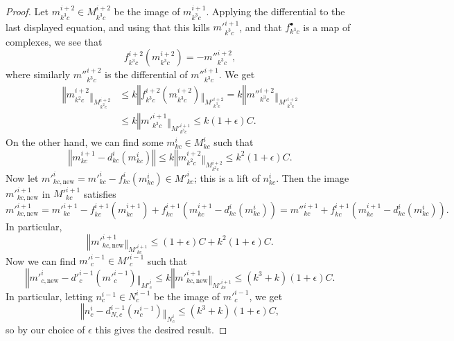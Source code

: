 \begin{proof}
Let $m^{i+2}_{k^3c}\in M^{i+2}_{k^3c}$ be the image of $m^{i+1}_{k^3c}$. Applying the differential to the last displayed equation, and using that this kills $m'^{i+1}_{k^3c}$, and that $f^\bullet_{k^3c}$ is a map of complexes, we see that
\[
f^{i+2}_{k^3c}(m^{i+2}_{k^3c}) = -m''^{i+2}_{k^3c},
\]
where similarly $m''^{i+2}_{k^3c}$ is the differential of $m''^{i+1}_{k^3c}$. We get
\[\begin{aligned}
‖m^{i+2}_{k^2c}‖_{M^{i+2}_{k^2c}}&\leq k‖f^{i+2}_{k^3c}(m^{i+2}_{k^3c})‖_{M'^{i+2}_{k^3c}} = k‖m''^{i+2}_{k^3c}‖_{M'^{i+2}_{k^3c}}\\
&\leq k‖m'^{i+1}_{k^3c}‖_{M'^{i+1}_{k^3c}}\leq k(1+\epsilon)C.
\end{aligned}\]
On the other hand, we can find some $m^i_{kc}\in M^i_{kc}$ such that
\[
‖m^{i+1}_{kc}-d^i_{kc}(m^i_{kc})‖\leq k‖m^{i+2}_{k^2c}‖_{M^{i+2}_{k^2c}}\leq k^2(1+\epsilon)C.
\]
Now let $m'^i_{kc,\mathrm{new}} = m'^i_{kc}-f^i_{kc}(m^i_{kc})\in M'^i_{kc}$; this is a lift of $n^i_{kc}$. Then the image $m'^{i+1}_{kc,\mathrm{new}}$ in $M'^{i+1}_{kc}$ satisfies
\[
m'^{i+1}_{kc,\mathrm{new}} = m'^{i+1}_{kc}-f^{i+1}_{kc}(m^{i+1}_{kc}) + f^{i+1}_{kc}(m^{i+1}_{kc}-d^i_{kc}(m^i_{kc})) = m''^{i+1}_{kc} + f^{i+1}_{kc}(m^{i+1}_{kc}-d^i_{kc}(m^i_{kc})).
\]
In particular,
\[
‖m'^{i+1}_{kc,\mathrm{new}}‖_{M'^{i+1}_{kc}}\leq (1+\epsilon)C+ k^2(1+\epsilon)C.
\]
Now we can find $m'^{i-1}_c\in M'^{i-1}_c$ such that
\[
‖m'^i_{c,\mathrm{new}} - d'^{i-1}_c(m'^{i-1}_c)‖_{M'^i_c}\leq k‖m'^{i+1}_{kc,\mathrm{new}}‖_{M'^{i+1}_{kc}}\leq (k^3+k)(1+\epsilon)C.
\]
In particular, letting $n^{i-1}_c\in N^{i-1}_c$ be the image of $m'^{i-1}_c$, we get
\[
‖n^i_c - d^{i-1}_{N,c}(n^{i-1}_c)‖_{N^i_c}\leq (k^3+k)(1+\epsilon)C,
\]
so by our choice of $\epsilon$ this gives the desired result.
\end{proof}




